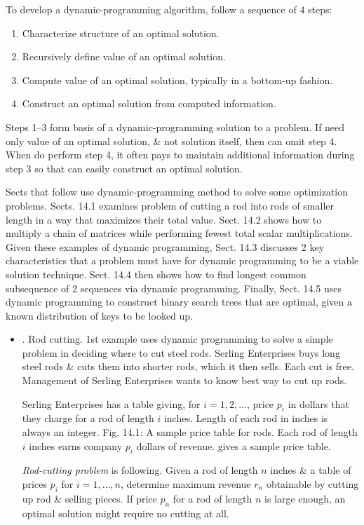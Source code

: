 \documentclass{article}
\begin{document}
\begin{itemize}
\begin{itemize}
		To develop a dynamic-programming algorithm, follow a sequence of 4 steps:
		\begin{enumerate}
			\item Characterize structure of an optimal solution.
			\item Recursively define value of an optimal solution.
			\item Compute value of an optimal solution, typically in a bottom-up fashion.
			\item Construct an optimal solution from computed information.
		\end{enumerate}
		Steps 1--3 form basis of a dynamic-programming solution to a problem. If need only value of an optimal solution, \& not solution itself, then can omit step 4. When do perform step 4, it often pays to maintain additional information during step 3 so that can easily construct an optimal solution.
		
		Sects that follow use dynamic-programming method to solve some optimization problems. Sects. 14.1 examines problem of cutting a rod into rods of smaller length in a way that maximizes their total value. Sect. 14.2 shows how to multiply a chain of matrices while performing fewest total scalar multiplications. Given these examples of dynamic programming, Sect. 14.3 discusses 2 key characteristics that a problem must have for dynamic programming to be a viable solution technique. Sect. 14.4 then shows how to find longest common subsequence of 2 sequences via dynamic programming. Finally, Sect. 14.5 uses dynamic programming to construct binary search trees that are optimal, given a known distribution of keys to be looked up.
		\begin{itemize}
			\item {. Rod cutting.} 1st example uses dynamic programming to solve a simple problem in deciding where to cut steel rods. Serling Enterprises buys long steel rods \& cuts them into shorter rods, which it then sells. Each cut is free. Management of Serling Enterprises wants to know best way to cut up rods.
			
			Serling Enterprises has a table giving, for $i = 1,2,\ldots$, price $p_i$ in dollars that they charge for a rod of length $i$ inches. Length of each rod in inches is always an integer. {\sf Fig. 14.1: A sample price table for rods. Each rod of length $i$ inches earns company $p_i$ dollars of revenue.} gives a sample price table.
			
			{\it Rod-cutting problem} is following. Given a rod of length $n$ inches \& a table of prices $p_i$ for $i = 1,\ldots,n$, determine maximum revenue $r_n$ obtainable by cutting up rod \& selling pieces. If price $p_n$ for a rod of length $n$ is large enough, an optimal solution might require no cutting at all.
			

\end{itemize}
\end{itemize}
\end{itemize}
\end{document}
